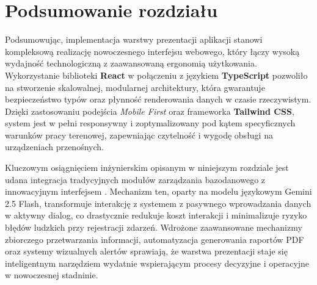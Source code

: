 \section{Podsumowanie rozdziału}

Podsumowując, implementacja warstwy prezentacji aplikacji  stanowi kompleksową realizację nowoczesnego interfejsu webowego, który łączy wysoką wydajność technologiczną z zaawansowaną ergonomią użytkowania. Wykorzystanie biblioteki \textbf{React} w połączeniu z językiem \textbf{TypeScript} pozwoliło na stworzenie skalowalnej, modularnej architektury, która gwarantuje bezpieczeństwo typów oraz płynność renderowania danych w czasie rzeczywistym. Dzięki zastosowaniu podejścia \textit{Mobile First} oraz frameworka \textbf{Tailwind CSS}, system jest w pełni responsywny i zoptymalizowany pod kątem specyficznych warunków pracy terenowej, zapewniając czytelność i wygodę obsługi na urządzeniach przenośnych.

Kluczowym osiągnięciem inżynierskim opisanym w niniejszym rozdziale jest udana integracja tradycyjnych modułów zarządzania bazodanowego z innowacyjnym interfejsem . Mechanizm ten, oparty na modelu językowym Gemini 2.5 Flash, transformuje interakcję z systemem z pasywnego wprowadzania danych w aktywny dialog, co drastycznie redukuje koszt interakcji i minimalizuje ryzyko błędów ludzkich przy rejestracji zdarzeń. Wdrożone zaawansowane mechanizmy zbiorczego przetwarzania informacji, automatyzacja generowania raportów PDF oraz systemy wizualnych alertów sprawiają, że warstwa prezentacji staje się inteligentnym narzędziem wydatnie wspierającym procesy decyzyjne i operacyjne w nowoczesnej stadninie.
